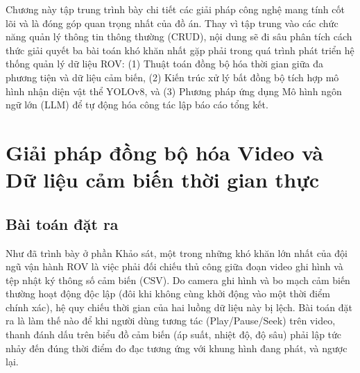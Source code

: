 \documentclass[../DoAn.tex]{subfiles}
\begin{document}
Chương này tập trung trình bày chi tiết các giải pháp công nghệ mang tính cốt lõi và là đóng góp quan trọng nhất của đồ án. Thay vì tập trung vào các chức năng quản lý thông tin thông thường (CRUD), nội dung sẽ đi sâu phân tích cách thức giải quyết ba bài toán khó khăn nhất gặp phải trong quá trình phát triển hệ thống quản lý dữ liệu ROV: (1) Thuật toán đồng bộ hóa thời gian giữa đa phương tiện và dữ liệu cảm biến, (2) Kiến trúc xử lý bất đồng bộ tích hợp mô hình nhận diện vật thể YOLOv8, và (3) Phương pháp ứng dụng Mô hình ngôn ngữ lớn (LLM) để tự động hóa công tác lập báo cáo tổng kết.

\section{Giải pháp đồng bộ hóa Video và Dữ liệu cảm biến thời gian thực}
\label{section:5.1}
\subsection{Bài toán đặt ra}
Như đã trình bày ở phần Khảo sát, một trong những khó khăn lớn nhất của đội ngũ vận hành ROV là việc phải đối chiếu thủ công giữa đoạn video ghi hình và tệp nhật ký thông số cảm biến (CSV). Do camera ghi hình và bo mạch cảm biến thường hoạt động độc lập (đôi khi không cùng khởi động vào một thời điểm chính xác), hệ quy chiếu thời gian của hai luồng dữ liệu này bị lệch. Bài toán đặt ra là làm thế nào để khi người dùng tương tác (Play/Pause/Seek) trên video, thanh đánh dấu trên biểu đồ cảm biến (áp suất, nhiệt độ, độ sâu) phải lập tức nhảy đến đúng thời điểm đo đạc tương ứng với khung hình đang phát, và ngược lại.
\end{document}
